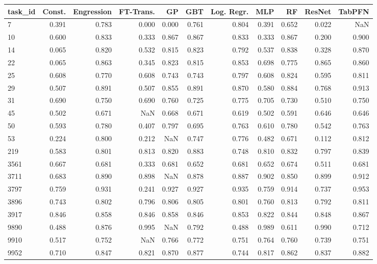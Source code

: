 \begin{tabular}{lrrrrrrrrrr}
\toprule
task\_id & Const. & Engression & FT-Trans. & GP & GBT & Log. Regr. & MLP & RF & ResNet & TabPFN \\
\midrule
7 & 0.391 & 0.783 & 0.000 & 0.000 & 0.761 & 0.804 & 0.391 & 0.652 & 0.022 & NaN \\
10 & 0.600 & 0.833 & 0.333 & 0.867 & 0.867 & 0.833 & 0.333 & 0.867 & 0.200 & 0.900 \\
14 & 0.065 & 0.820 & 0.532 & 0.815 & 0.823 & 0.792 & 0.537 & 0.838 & 0.328 & 0.870 \\
22 & 0.065 & 0.863 & 0.345 & 0.823 & 0.815 & 0.853 & 0.698 & 0.775 & 0.865 & 0.860 \\
25 & 0.608 & 0.770 & 0.608 & 0.743 & 0.743 & 0.797 & 0.608 & 0.824 & 0.595 & 0.811 \\
29 & 0.507 & 0.891 & 0.507 & 0.855 & 0.891 & 0.870 & 0.580 & 0.884 & 0.768 & 0.913 \\
31 & 0.690 & 0.750 & 0.690 & 0.760 & 0.725 & 0.775 & 0.705 & 0.730 & 0.510 & 0.750 \\
45 & 0.502 & 0.671 & NaN & 0.668 & 0.671 & 0.619 & 0.502 & 0.591 & 0.646 & 0.646 \\
50 & 0.593 & 0.780 & 0.407 & 0.797 & 0.695 & 0.763 & 0.610 & 0.780 & 0.542 & 0.763 \\
53 & 0.224 & 0.800 & 0.212 & NaN & 0.747 & 0.776 & 0.482 & 0.671 & 0.112 & 0.812 \\
219 & 0.583 & 0.801 & 0.813 & 0.820 & 0.883 & 0.748 & 0.810 & 0.832 & 0.797 & 0.839 \\
3561 & 0.667 & 0.681 & 0.333 & 0.681 & 0.652 & 0.681 & 0.652 & 0.674 & 0.511 & 0.681 \\
3711 & 0.683 & 0.890 & 0.898 & NaN & 0.878 & 0.887 & 0.902 & 0.850 & 0.899 & 0.912 \\
3797 & 0.759 & 0.931 & 0.241 & 0.927 & 0.927 & 0.935 & 0.759 & 0.914 & 0.737 & 0.953 \\
3896 & 0.743 & 0.802 & 0.796 & 0.806 & 0.805 & 0.801 & 0.760 & 0.813 & 0.792 & 0.811 \\
3917 & 0.846 & 0.858 & 0.846 & 0.858 & 0.846 & 0.853 & 0.822 & 0.844 & 0.848 & 0.867 \\
9890 & 0.488 & 0.876 & 0.995 & NaN & 0.792 & 0.488 & 0.989 & 0.611 & 0.990 & 0.712 \\
9910 & 0.517 & 0.752 & NaN & 0.766 & 0.772 & 0.751 & 0.764 & 0.760 & 0.739 & 0.751 \\
9952 & 0.710 & 0.847 & 0.821 & 0.870 & 0.877 & 0.744 & 0.817 & 0.862 & 0.837 & 0.882 \\

\end{tabular}
